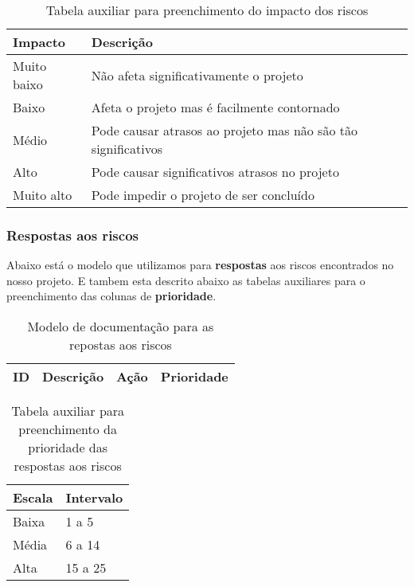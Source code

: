         \begin{table}[h]
            \centering
            \begin{tabular}{|p{3cm}|p{3cm}|}
            \hline
            \textbf{Impacto}  & \textbf{Descrição} \\ \hline
            Muito baixo & Não afeta significativamente o projeto \\ \hline
            Baixo & Afeta o projeto mas é facilmente contornado \\ \hline
            Médio & Pode causar atrasos ao projeto mas não são tão significativos \\ \hline
            Alto & Pode causar significativos atrasos no projeto \\ \hline
            Muito alto & Pode impedir o projeto de ser concluído \\ \hline
        \end{tabular}
            \caption{Tabela auxiliar para preenchimento do impacto dos riscos}
            \end{table}

\subsubsection{Respostas aos riscos}
Abaixo está o modelo que utilizamos para \textbf{respostas} aos riscos encontrados no nosso projeto. E tambem esta descrito abaixo as tabelas auxiliares para o preenchimento das colunas de \textbf{prioridade}.

\begin{table}[h]
    \centering
    \begin{tabular}{|p{3cm}|p{3cm}|p{3cm}|p{3cm}|}
    \hline
    \textbf{ID}  & \textbf{Descrição} & \textbf{Ação} & \textbf{Prioridade} \\ \hline
\end{tabular}
    \caption{Modelo de documentação para as repostas aos riscos}
    \end{table}

\begin{table}[h]
    \centering
    \begin{tabular}{|p{3cm}|p{3cm}|}
    \hline
    \textbf{Escala}  & \textbf{Intervalo} \\ \hline
    Baixa & 1 a 5 \\ \hline
    Média & 6 a 14 \\ \hline
    Alta & 15 a 25 \\ \hline
\end{tabular}
    \caption{Tabela auxiliar para preenchimento da prioridade das respostas aos riscos}
    \end{table}

            